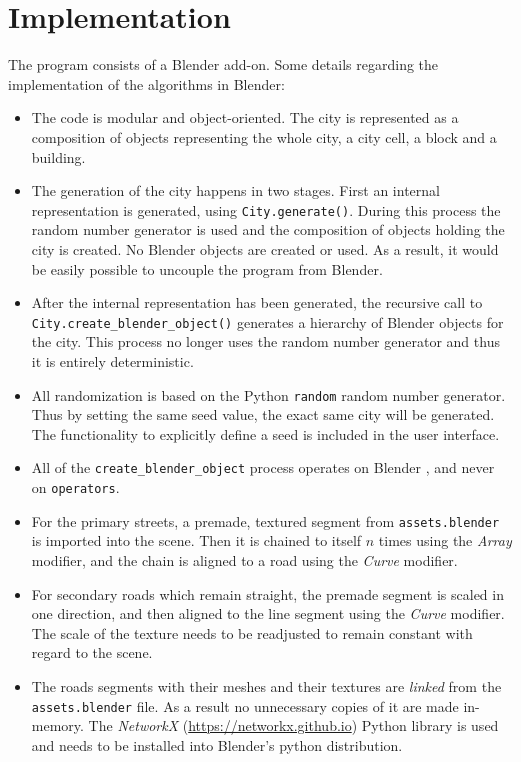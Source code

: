 \documentclass[a4paper,12pt]{scrartcl}
\begin{document}
\section{Implementation}
\label{sec:implementation}
The program consists of a Blender add-on. Some details regarding the implementation of the algorithms in Blender:
\begin{itemize}
\item The code is modular and object-oriented. The city is represented as a composition of objects representing the whole city, a city cell, a block and a building.
\item The generation of the city happens in two stages. First an internal representation is generated, using \texttt{City.generate()}. During this process the random number generator is used and the composition of objects holding the city is created. No Blender objects are created or used. As a result, it would be easily possible to uncouple the program from Blender.
\item After the internal representation has been generated, the recursive call to \\ \texttt{City.create\_blender\_object()} generates a hierarchy of Blender objects for the city. This process no longer uses the random number generator and thus it is entirely deterministic.
\item All randomization is based on the Python \texttt{random} random number generator. Thus by setting the same seed value, the exact same city will be generated. The functionality to explicitly define a seed is included in the user interface.
\item All of the \texttt{create\_blender\_object} process operates on Blender , and never on \texttt{operators}.
\item For the primary streets, a premade, textured segment from \texttt{assets.blender} is imported into the scene. Then it is chained to itself $n$ times using the \emph{Array} modifier, and the chain is aligned to a road using the \emph{Curve} modifier.
\item For secondary roads which remain straight, the premade segment is scaled in one direction, and then aligned to the line segment using the \emph{Curve} modifier. The scale of the texture needs to be readjusted to remain constant with regard to the scene.
\item The roads segments with their meshes and their textures are \emph{linked} from the \texttt{assets.blender} file. As a result no unnecessary copies of it are made in-memory.
\tem The \emph{NetworkX} (\url{https://networkx.github.io}) Python library is used and needs to be installed into Blender's python distribution.
\end{itemize}
\end{document}
